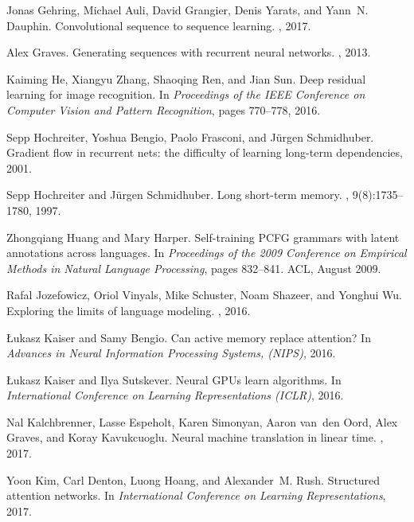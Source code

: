 \documentclass{article}
\begin{document}
\begin{thebibliography}{10}
Jonas Gehring, Michael Auli, David Grangier, Denis Yarats, and Yann~N. Dauphin.
\newblock Convolutional sequence to sequence learning.
, 2017.

Alex Graves.
\newblock Generating sequences with recurrent neural networks.
, 2013.

Kaiming He, Xiangyu Zhang, Shaoqing Ren, and Jian Sun.
\newblock Deep residual learning for image recognition.
\newblock In {\em Proceedings of the IEEE Conference on Computer Vision and
  Pattern Recognition}, pages 770--778, 2016.

Sepp Hochreiter, Yoshua Bengio, Paolo Frasconi, and J{\"u}rgen Schmidhuber.
\newblock Gradient flow in recurrent nets: the difficulty of learning long-term
  dependencies, 2001.

Sepp Hochreiter and J{\"u}rgen Schmidhuber.
\newblock Long short-term memory.
, 9(8):1735--1780, 1997.

Zhongqiang Huang and Mary Harper.
\newblock Self-training {PCFG} grammars with latent annotations across
  languages.
\newblock In {\em Proceedings of the 2009 Conference on Empirical Methods in
  Natural Language Processing}, pages 832--841. ACL, August 2009.

Rafal Jozefowicz, Oriol Vinyals, Mike Schuster, Noam Shazeer, and Yonghui Wu.
\newblock Exploring the limits of language modeling.
, 2016.

{\L}ukasz Kaiser and Samy Bengio.
\newblock Can active memory replace attention?
\newblock In {\em Advances in Neural Information Processing Systems, ({NIPS})},
  2016.

\L{}ukasz Kaiser and Ilya Sutskever.
\newblock Neural {GPU}s learn algorithms.
\newblock In {\em International Conference on Learning Representations
  ({ICLR})}, 2016.

Nal Kalchbrenner, Lasse Espeholt, Karen Simonyan, Aaron van~den Oord, Alex
  Graves, and Koray Kavukcuoglu.
\newblock Neural machine translation in linear time.
, 2017.

Yoon Kim, Carl Denton, Luong Hoang, and Alexander~M. Rush.
\newblock Structured attention networks.
\newblock In {\em International Conference on Learning Representations}, 2017.


\end{thebibliography}
\end{document}
